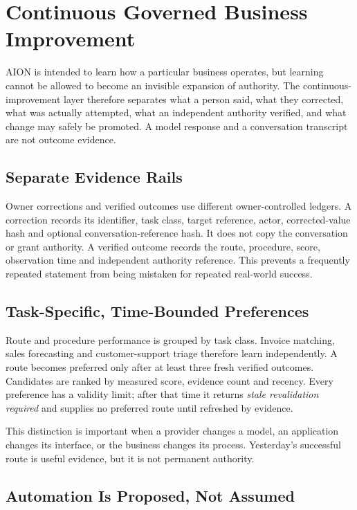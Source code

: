 \section{Continuous Governed Business Improvement}
\label{sec:aion-governed-business-improvement}

AION is intended to learn how a particular business operates, but learning cannot be allowed to
become an invisible expansion of authority.  The continuous-improvement layer therefore separates
what a person said, what they corrected, what was actually attempted, what an independent authority
verified, and what change may safely be promoted.  A model response and a conversation transcript
are not outcome evidence.

\subsection{Separate Evidence Rails}

Owner corrections and verified outcomes use different owner-controlled ledgers.  A correction
records its identifier, task class, target reference, actor, corrected-value hash and optional
conversation-reference hash.  It does not copy the conversation or grant authority.  A verified
outcome records the route, procedure, score, observation time and independent authority reference.
This prevents a frequently repeated statement from being mistaken for repeated real-world success.

\subsection{Task-Specific, Time-Bounded Preferences}

Route and procedure performance is grouped by task class.  Invoice matching, sales forecasting and
customer-support triage therefore learn independently.  A route becomes preferred only after at
least three fresh verified outcomes.  Candidates are ranked by measured score, evidence count and
recency.  Every preference has a validity limit; after that time it returns
\emph{stale revalidation required} and supplies no preferred route until refreshed by evidence.

This distinction is important when a provider changes a model, an application changes its interface,
or the business changes its process.  Yesterday's successful route is useful evidence, but it is not
permanent authority.

\subsection{Automation Is Proposed, Not Assumed}

